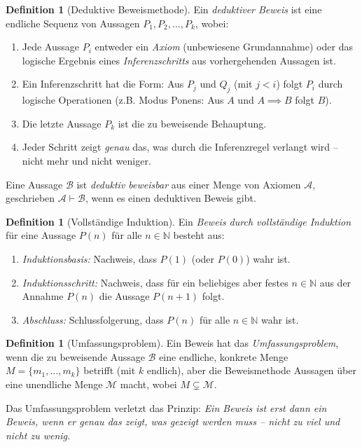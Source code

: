 \documentclass[12pt, a4paper]{article}
\theoremstyle{definition}
\newtheorem{definition}[theorem]{Definition}
\theoremstyle{remark}
\newcommand{\N}{\mathbb{N}}
\begin{document}
\begin{definition}[Deduktive Beweismethode]
\label{def:deduktion}
Ein \emph{deduktiver Beweis} ist eine endliche Sequenz von Aussagen $P_1, P_2, \ldots, P_k$, wobei:
\begin{enumerate}[label=(\alph*)]
  \item Jede Aussage $P_i$ entweder ein \emph{Axiom} (unbewiesene Grundannahme) oder das logische Ergebnis eines \emph{Inferenzschritts} aus vorhergehenden Aussagen ist.
  \item Ein Inferenzschritt hat die Form: Aus $P_j$ und $Q_j$ (mit $j < i$) folgt $P_i$ durch logische Operationen (z.B. Modus Ponens: Aus $A$ und $A \implies B$ folgt $B$).
  \item Die letzte Aussage $P_k$ ist die zu beweisende Behauptung.
  \item Jeder Schritt zeigt \emph{genau} das, was durch die Inferenzregel verlangt wird -- nicht mehr und nicht weniger.
\end{enumerate}

Eine Aussage $\mathcal{B}$ ist \emph{deduktiv beweisbar} aus einer Menge von Axiomen $\mathcal{A}$, geschrieben $\mathcal{A} \vdash \mathcal{B}$, wenn es einen deduktiven Beweis gibt.
\end{definition}

\begin{definition}[Vollständige Induktion]
\label{def:vollstaendige_induktion}
Ein \emph{Beweis durch vollständige Induktion} für eine Aussage $P(n)$ für alle $n \in \N$ besteht aus:
\begin{enumerate}[label=(\roman*)]
  \item \emph{Induktionsbasis:} Nachweis, dass $P(1)$ (oder $P(0)$) wahr ist.
  \item \emph{Induktionsschritt:} Nachweis, dass für ein beliebiges aber festes $n \in \N$ aus der Annahme $P(n)$ die Aussage $P(n+1)$ folgt.
  \item \emph{Abschluss:} Schlussfolgerung, dass $P(n)$ für alle $n \in \N$ wahr ist.
\end{enumerate}
\end{definition}

\begin{definition}[Umfassungsproblem]
\label{def:umfassungsproblem}
Ein Beweis hat das \emph{Umfassungsproblem}, wenn die zu beweisende Aussage $\mathcal{B}$ eine endliche, konkrete Menge $M = \{m_1, \ldots, m_k\}$ betrifft (mit $k$ endlich), aber die Beweismethode Aussagen über eine unendliche Menge $\mathcal{M}$ macht, wobei $M \subsetneq \mathcal{M}$.

Das Umfassungsproblem verletzt das Prinzip: \emph{Ein Beweis ist erst dann ein Beweis, wenn er genau das zeigt, was gezeigt werden muss -- nicht zu viel und nicht zu wenig.}
\end{definition}
\end{document}
